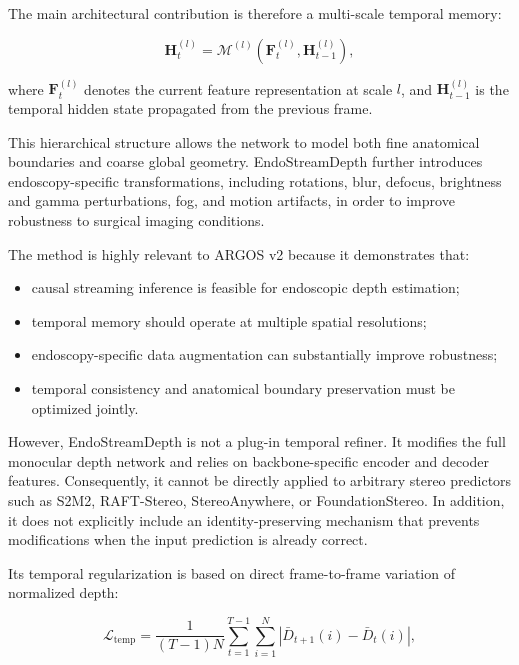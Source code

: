 \documentclass[11pt,a4paper]{article}
\begin{document}
The main architectural contribution is therefore a multi-scale temporal memory:

\begin{equation}
\mathbf{H}_{t}^{(l)}
=
\mathcal{M}^{(l)}
\left(
\mathbf{F}_{t}^{(l)},
\mathbf{H}_{t-1}^{(l)}
\right),
\end{equation}

where $\mathbf{F}_{t}^{(l)}$ denotes the current feature representation at scale $l$, and $\mathbf{H}_{t-1}^{(l)}$ is the temporal hidden state propagated from the previous frame.

This hierarchical structure allows the network to model both fine anatomical boundaries and coarse global geometry. EndoStreamDepth further introduces endoscopy-specific transformations, including rotations, blur, defocus, brightness and gamma perturbations, fog, and motion artifacts, in order to improve robustness to surgical imaging conditions.

The method is highly relevant to ARGOS v2 because it demonstrates that:

\begin{itemize}
    \item causal streaming inference is feasible for endoscopic depth estimation;
    \item temporal memory should operate at multiple spatial resolutions;
    \item endoscopy-specific data augmentation can substantially improve robustness;
    \item temporal consistency and anatomical boundary preservation must be optimized jointly.
\end{itemize}

However, EndoStreamDepth is not a plug-in temporal refiner. It modifies the full monocular depth network and relies on backbone-specific encoder and decoder features. Consequently, it cannot be directly applied to arbitrary stereo predictors such as S2M2, RAFT-Stereo, StereoAnywhere, or FoundationStereo. In addition, it does not explicitly include an identity-preserving mechanism that prevents modifications when the input prediction is already correct.

Its temporal regularization is based on direct frame-to-frame variation of normalized depth:

\begin{equation}
\mathcal{L}_{\mathrm{temp}}
=
\frac{1}{(T-1)N}
\sum_{t=1}^{T-1}
\sum_{i=1}^{N}
\left|
\bar{D}_{t+1}(i)
-
\bar{D}_{t}(i)
\right|,
\end{equation}
\end{document}
